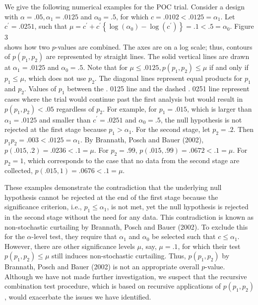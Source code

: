 \documentclass[10pt]{article}
\begin{document}
We give the following numerical examples for the POC trial. Consider a design with $\alpha=.05, \alpha_{1}=.0125$ and $\alpha_{0}=.5$, for which $c=.0102<.0125=\alpha_{1}$. Let $c^{\prime}=.0251$, such that $\mu=c^{\prime}+c^{\prime}\left\{\log \left(\alpha_{0}\right)-\log \left(c^{\prime}\right)\right\}=.1<.5=\alpha_{0}$. Figure 3\\
shows how two $p$-values are combined. The axes are on a log scale; thus, contours of $p\left(p_{1}, p_{2}\right)$ are represented by straight lines. The solid vertical lines are drawn at $\alpha_{1}=.0125$ and $\alpha_{0}=.5$. Note that for $\mu \leq .0125, p\left(p_{1}, p_{2}\right) \leq \mu$ if and only if $p_{1} \leq \mu$, which does not use $p_{2}$. The diagonal lines represent equal products for $p_{1}$ and $p_{2}$. Values of $p_{1}$ between the . 0125 line and the dashed . 0251 line represent cases where the trial would continue past the first analysis but would result in $p\left(p_{1}, p_{2}\right)<.05$ regardless of $p_{2}$. For example, for $p_{1}=.015$, which is larger than $\alpha_{1}=.0125$ and smaller than $c^{\prime}=.0251$ and $\alpha_{0}=.5$, the null hypothesis is not rejected at the first stage because $p_{1}>\alpha_{1}$. For the second stage, let $p_{2}=.2$. Then $p_{1} p_{2}=.003<.0125=\alpha_{1}$. By Brannath, Posch and Bauer (2002), $p(.015, .2)=.0236<.1=\mu$. For $p_{2}=.99$, $p(.015, .99)=.0672<.1=\mu$. For $p_{2}=1$, which corresponds to the case that no data from the second stage are collected, $p(.015,1)=.0676<.1=\mu$.

These examples demonstrate the contradiction that the underlying null hypothesis cannot be rejected at the end of the first stage because the significance criterion, i.e., $p_{1} \leq \alpha_{1}$, is not met, yet the null hypothesis is rejected in the second stage without the need for any data. This contradiction is known as non-stochastic curtailing by Brannath, Posch and Bauer (2002). To exclude this for the $\alpha$-level test, they require that $\alpha_{1}$ and $\alpha_{0}$ be selected such that $c \leq \alpha_{1}$. However, there are other significance levels $\mu$, say, $\mu=.1$, for which their test $p\left(p_{1}, p_{2}\right) \leq \mu$ still induces non-stochastic curtailing. Thus, $p\left(p_{1}, p_{2}\right)$ by Brannath, Posch and Bauer (2002) is not an appropriate overall $p$-value. Although we have not made further investigation, we suspect that the recursive combination test procedure, which is based on recursive applications of $p\left(p_{1}, p_{2}\right)$, would exacerbate the issues we have identified.
\end{document}
